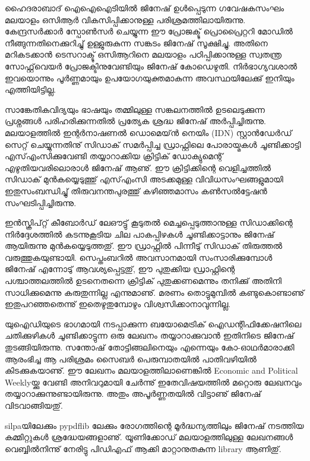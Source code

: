 ഹൈദരാബാദ് ഐഐഐടിയില്‍ ജിനേഷ് ഉള്‍പ്പെടുന്ന ഗവേഷകസംഘം മലയാളം ഒസിആര്‍ വികസിപ്പിക്കാനുള്ള 
പരിശ്രമത്തിലായിരുന്നു. കേന്ദ്രസര്‍ക്കാര്‍ സ്പോണ്‍സര്‍ ചെയ്യുന്ന ഈ പ്രോജക്ടു് പ്രൊപ്രൈറ്ററി മോഡില്‍ നീങ്ങുന്നതിനെക്കുറിച്ചു് 
ഉള്ളുരുകുന്ന സങ്കടം ജിനേഷ് സൂക്ഷിച്ചു. അതിനെ മറികടക്കാന്‍ ടെസറാക്ടു് ഒസിആറിനെ മലയാളം പഠിപ്പിക്കാനുള്ള സ്വതന്ത്ര 
സോഫ്റ്റ്‌വെയര്‍ പ്രോജക്ടിനുവേണ്ടിയും ജിനേഷ് കോഡെഴുതി. നിര്‍ഭാഗ്യവശാല്‍ ഇവയൊന്നും പൂര്‍ണ്ണമായും 
ഉപയോഗയുക്തമാകുന്ന അവസ്ഥയിലേക്കു് ഇനിയും എത്തിയിട്ടില്ല.

സാങ്കേതികവിദ്യയും ഭാഷയും തമ്മിലുള്ള സങ്കലനത്തില്‍ ഉടലെടുക്കുന്ന പ്രശ്നങ്ങള്‍ പരിഹരിക്കുന്നതില്‍ പ്രത്യേക ശ്രദ്ധ ജിനേഷ് 
അര്‍പ്പിച്ചിരുന്നു. മലയാളത്തില്‍ ഇന്റര്‍നാഷണല്‍ ഡൊമെയ്ന്‍ നെയിം (IDN) സ്റ്റാന്‍ഡേര്‍ഡ് സെറ്റ് ചെയ്യുന്നതിനു് സിഡാക്‍ 
സമര്‍പ്പിച്ച ഡ്രാഫ്റ്റിലെ പോരായ്മകള്‍ ചൂണ്ടിക്കാട്ടി എസ്എംസിക്കുവേണ്ടി തയ്യാറാക്കിയ ക്രിട്ടിക്‍ ഡോക്യുമെന്റ് 
എഴുതിയവരിലൊരാള്‍ ജിനേഷ് ആണു്. ഈ ക്രിട്ടിക്കിന്റെ വെളിച്ചത്തില്‍ സിഡാക്‍ മുന്‍കയ്യെടുത്തു് എസ്എംസി അടക്കമുള്ള 
വിവിധസംഘങ്ങളുമായി ഇതുസംബന്ധിച്ചു് തിരുവനന്തപുരത്തു് കഴിഞ്ഞമാസം കണ്‍സല്‍ട്ടേഷന്‍ സംഘടിപ്പിച്ചിരുന്നു.

ഇന്‍സ്ക്രിപ്റ്റ് കീബോര്‍ഡ് ലേഔട്ടു് കൂടുതല്‍ മെച്ചപ്പെടുത്താനുള്ള സിഡാക്കിന്റെ നിര്‍ദ്ദേശത്തില്‍ കടന്നുകൂടിയ ചില പാകപ്പിഴകള്‍ 
ചൂണ്ടിക്കാട്ടാനും ജിനേഷ് ആയിരുന്നു മുന്‍കയ്യെടുത്തതു്. ഈ ഡ്രാഫ്റ്റില്‍ പിന്നീടു് സിഡാക്‍ തിരുത്തല്‍ വരുത്തുകയുണ്ടായി. 
സെപ്തംബറില്‍ അവസാനമായി സംസാരിക്കുമ്പോള്‍ ജിനേഷ് എന്നോടു് ആവശ്യപ്പെട്ടതു്, ഈ പുതുക്കിയ ഡ്രാഫ്റ്റിന്റെ 
പശ്ചാത്തലത്തില്‍ ഉടനെതന്നെ ക്രിട്ടിക്‍ പുതുക്കണമെന്നും തനിക്കു് അതിനി സാധിക്കുമെന്നു കരുതുന്നില്ല എന്നുമാണു്. മരണം 
തൊട്ടുമുമ്പില്‍ കണ്ടുകൊണ്ടാണു് ഇതുപറഞ്ഞതെന്നു് ഇതെഴുതുമ്പോഴും വിശ്വസിക്കാനാവുന്നില്ല.

യുഐഡിയുടെ ഭാഗമായി നടപ്പാക്കുന്ന ബയോമെട്രിക്‍ ഐഡന്റിഫിക്കേഷനിലെ ചതിക്കുഴികള്‍ ചൂണ്ടിക്കാട്ടുന്ന ഒരു ലേഖനം 
തയ്യാറാക്കുവാന്‍ ഇതിനിടെ ജിനേഷ് തുടങ്ങിയിരുന്നു. സന്തോഷ് തോട്ടിങ്ങലിനെയും എന്നെയും കോ-ഓഥര്‍മാരാക്കി ആരംഭിച്ച 
ആ പരിശ്രമം സൈബര്‍ പെരുമ്പാതയില്‍ പാതിവഴിയില്‍ കിടക്കുകയാണു്. ഈ ലേഖനം മലയാളത്തിലാണെങ്കില്‍ 
Economic and Political Weeklyയ്ക്കു വേണ്ടി അനിവറുമായി ചേര്‍ന്നു് ഇതേവിഷയത്തില്‍ മറ്റൊരു ലേഖനവും 
തയ്യാറാക്കുന്നുണ്ടായിരുന്നു. അതും അപൂര്‍ണ്ണതയില്‍ വിട്ടാണു് ജിനേഷ് വിടവാങ്ങിയതു്.


silpaയിലേക്കും pypdflib ലേക്കും രോഗത്തിന്റെ മൂര്‍ദ്ധന്യത്തിലും ജിനേഷ് നടത്തിയ കമ്മിറ്റുകള്‍ ശ്രദ്ധേയങ്ങളാണു്. യൂണിക്കോഡ് 
മലയാളത്തിലുള്ള ലേഖനങ്ങള്‍ വെബ്ബില്‍നിന്നു് നേരിട്ടു പിഡിഎഫ് ആക്കി മാറ്റാനുതകുന്ന library ആണിതു്.

